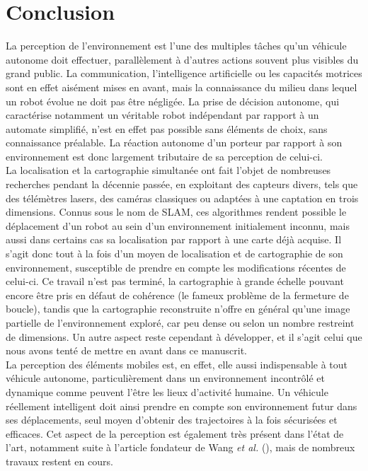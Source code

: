 \section{Conclusion} 

La perception de l'environnement est l'une des multiples tâches qu'un véhicule autonome doit effectuer, parallèlement à d'autres actions souvent plus visibles du grand public. La communication, l'intelligence artificielle ou les capacités motrices sont en effet aisément mises en avant, mais la connaissance du milieu dans lequel un robot évolue ne doit pas être négligée. La prise de décision autonome, qui caractérise notamment un véritable robot indépendant par rapport à un automate simplifié, n'est en effet pas possible sans éléments de choix, sans connaissance préalable. La réaction autonome d'un porteur par rapport à son environnement est donc largement tributaire de sa perception de celui-ci.\\
La localisation et la cartographie simultanée ont fait l'objet de nombreuses recherches pendant la décennie passée, en exploitant des capteurs divers, tels que des télémètres lasers, des caméras classiques ou adaptées à une captation en trois dimensions. Connus sous le nom de SLAM, ces algorithmes rendent possible le déplacement d'un robot au sein d'un environnement initialement inconnu, mais aussi dans certains cas sa localisation par rapport à une carte déjà acquise. Il s'agit donc tout à la fois d'un moyen de localisation et de cartographie de son environnement, susceptible de prendre en compte les modifications récentes de celui-ci. Ce travail n'est pas terminé, la cartographie à grande échelle pouvant encore être pris en défaut de cohérence (le fameux problème de la fermeture de boucle), tandis que la cartographie reconstruite n'offre en général qu'une image partielle de l'environnement exploré, car peu dense ou selon un nombre restreint de dimensions. Un autre aspect reste cependant à développer, et il s'agit celui que nous avons tenté de mettre en avant dans ce manuscrit. \\
La perception des éléments mobiles est, en effet, elle aussi indispensable à tout véhicule autonome, particulièrement dans un environnement incontrôlé et dynamique comme peuvent l'être les lieux d'activité humaine. Un véhicule réellement \og intelligent\fg{} doit ainsi prendre en compte son environnement futur dans ses déplacements, seul moyen d'obtenir des trajectoires à la fois sécurisées et efficaces. Cet aspect de la perception est également très présent dans l'état de l'art, notamment suite à l'article fondateur de Wang \textit{et al.} (\cite{Wang2007}), mais de nombreux travaux restent en cours.\\

